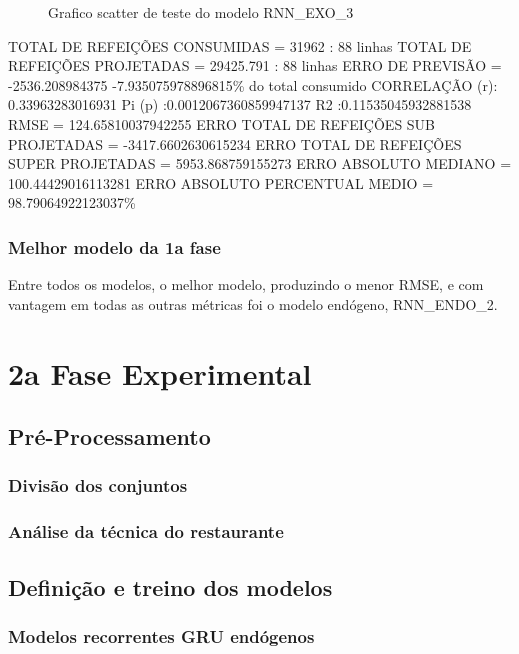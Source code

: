 \documentclass[	12pt, Times, openright, twoside, a4paper, english, brazil]{abntex2}
\begin{document}
                \begin{figure}[!ht]
                  \caption{Grafico scatter de teste do modelo RNN\_EXO\_3 \label{fig:case3_rnn_exo_3_test_scatter} }
                \end{figure}
                \hline TOTAL DE REFEIÇÕES CONSUMIDAS = 31962 : 88 linhas
                \hline TOTAL DE REFEIÇÕES PROJETADAS = 29425.791 : 88 linhas
                \hline ERRO DE PREVISÃO = -2536.208984375 -7.935075978896815\% do total consumido
                \hline CORRELAÇÃO (r): 0.33963283016931 Pi (p) :0.0012067360859947137 R2 :0.11535045932881538
                \hline RMSE = 124.65810037942255
                \hline ERRO TOTAL DE REFEIÇÕES SUB PROJETADAS = -3417.6602630615234
                \hline ERRO TOTAL DE REFEIÇÕES SUPER PROJETADAS = 5953.868759155273
                \hline ERRO ABSOLUTO MEDIANO = 100.44429016113281
                \hline ERRO ABSOLUTO PERCENTUAL MEDIO = 98.79064922123037\%

    	    \subsubsection{Melhor modelo da 1a fase}
            Entre todos os modelos, o melhor modelo, produzindo o menor RMSE, e com vantagem em todas as outras métricas foi o modelo endógeno, RNN\_ENDO\_2.

    \section{2a Fase Experimental}
	    \subsection{Pré-Processamento}
    	    \subsubsection{Divisão dos conjuntos}
    	    \subsubsection{Análise da técnica do restaurante}
    	\subsection{Definição e treino dos modelos}
    	    \subsubsection{Modelos recorrentes GRU endógenos}
\end{document}
